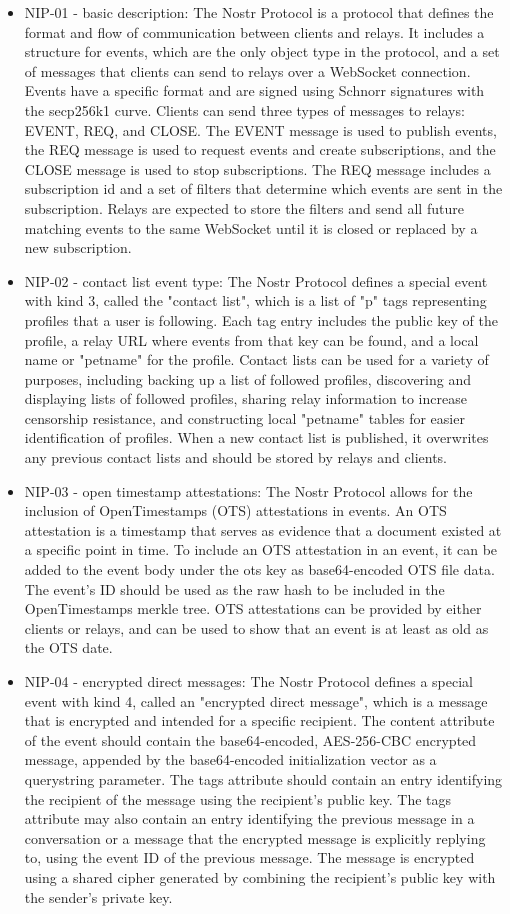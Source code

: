\begin{itemize}
\item NIP-01 - basic description: The Nostr Protocol is a protocol that defines the format and flow of communication between clients and relays. It includes a structure for events, which are the only object type in the protocol, and a set of messages that clients can send to relays over a WebSocket connection. Events have a specific format and are signed using Schnorr signatures with the secp256k1 curve. Clients can send three types of messages to relays: EVENT, REQ, and CLOSE. The EVENT message is used to publish events, the REQ message is used to request events and create subscriptions, and the CLOSE message is used to stop subscriptions. The REQ message includes a subscription id and a set of filters that determine which events are sent in the subscription. Relays are expected to store the filters and send all future matching events to the same WebSocket until it is closed or replaced by a new subscription.
\item NIP-02 - contact list event type: The Nostr Protocol defines a special event with kind 3, called the "contact list", which is a list of "p" tags representing profiles that a user is following. Each tag entry includes the public key of the profile, a relay URL where events from that key can be found, and a local name or "petname" for the profile. Contact lists can be used for a variety of purposes, including backing up a list of followed profiles, discovering and displaying lists of followed profiles, sharing relay information to increase censorship resistance, and constructing local "petname" tables for easier identification of profiles. When a new contact list is published, it overwrites any previous contact lists and should be stored by relays and clients.
\item NIP-03 - open timestamp attestations: The Nostr Protocol allows for the inclusion of OpenTimestamps (OTS) attestations in events. An OTS attestation is a timestamp that serves as evidence that a document existed at a specific point in time. To include an OTS attestation in an event, it can be added to the event body under the ots key as base64-encoded OTS file data. The event's ID should be used as the raw hash to be included in the OpenTimestamps merkle tree. OTS attestations can be provided by either clients or relays, and can be used to show that an event is at least as old as the OTS date.
\item NIP-04 - encrypted direct messages: The Nostr Protocol defines a special event with kind 4, called an "encrypted direct message", which is a message that is encrypted and intended for a specific recipient. The content attribute of the event should contain the base64-encoded, AES-256-CBC encrypted message, appended by the base64-encoded initialization vector as a querystring parameter. The tags attribute should contain an entry identifying the recipient of the message using the recipient's public key. The tags attribute may also contain an entry identifying the previous message in a conversation or a message that the encrypted message is explicitly replying to, using the event ID of the previous message. The message is encrypted using a shared cipher generated by combining the recipient's public key with the sender's private key.

\end{itemize}
